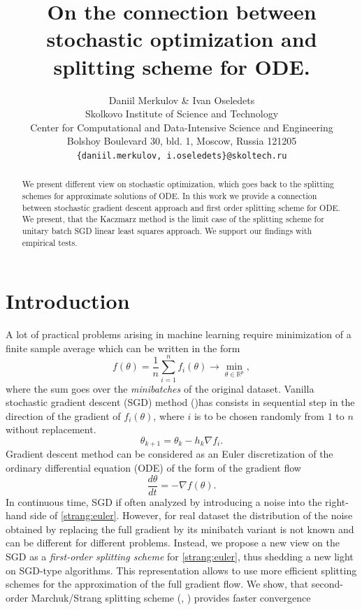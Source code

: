\documentclass{article} %
\title{On the connection between stochastic optimization and splitting scheme for ODE.}
\author{Daniil Merkulov \& Ivan Oseledets \\
Skolkovo Institute of Science and Technology\\
Center for Computational and Data-Intensive Science and Engineering\\
Bolshoy Boulevard 30, bld. 1, Moscow, Russia 121205 \\
\texttt{\{daniil.merkulov, i.oseledets\}@skoltech.ru} \\
}
\begin{document}
\maketitle

\begin{abstract}
We present different view on stochastic optimization, which goes back to the splitting schemes for approximate solutions of ODE. In this work we provide a connection between stochastic gradient descent approach and first order splitting scheme for ODE. We present, that the Kaczmarz method is the limit case of the splitting scheme for unitary batch SGD linear least squares approach. We support our findings with empirical tests.
\end{abstract}

\tableofcontents


\section{Introduction}
A lot of practical problems arising in machine learning require minimization of a finite sample average which can be written in the form
\begin{equation}\label{strang:finitesum}
    f(\theta) = \frac{1}{n} \sum_{i=1}^n f_i(\theta) \rightarrow \min_{\theta \in \mathbb{R}^p},
\end{equation}
where the sum goes over the \emph{minibatches} of the original dataset. Vanilla stochastic gradient descent (SGD) method (\cite{robbins1951stochastic})has consists in sequential step in the direction of the gradient of $f_i(\theta)$, where $i$ is to be chosen randomly from $1$ to $n$ without replacement.
$$
\theta_{k+1} = \theta_{k} - h_{k} \nabla f_i.
$$
Gradient descent method can be considered as an Euler discretization of the ordinary differential equation (ODE) of the form of the gradient flow
\begin{equation}\label{strang:euler}
    \frac{d \theta}{d t} = -\nabla f(\theta).
\end{equation}
In continuous time, SGD if often analyzed by introducing a noise into the right-hand side of \eqref{strang:euler}. However, for real dataset the distribution of the noise obtained by replacing the full gradient by its minibatch variant is not known and can be different for different problems. Instead, we propose a new view on the SGD as a \emph{first-order splitting scheme} for \eqref{strang:euler}, thus shedding a new light on SGD-type algorithms. This representation allows to use more efficient splitting schemes for the approximation of the full gradient flow. We show, that second-order Marchuk/Strang splitting scheme (\cite{marchuk1968some}, \cite{strang1968construction}) provides faster convergence 
\end{document}
